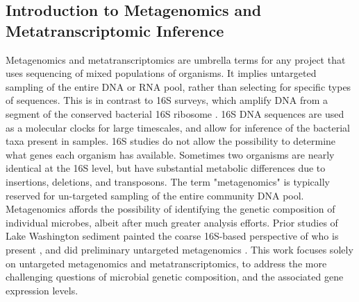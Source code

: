 \subsection{Introduction to Metagenomics and Metatranscriptomic Inference}
Metagenomics and metatranscriptomics are umbrella terms for any project that uses sequencing of mixed populations of organisms.
It implies untargeted sampling of the entire DNA or RNA pool, rather than selecting for specific types of sequences.
This is in contrast to 16S surveys, which amplify DNA from a segment of the conserved bacterial 16S ribosome \cite{kunin2008}.
16S DNA sequences are used as a molecular clocks for large timescales, and allow for inference of the bacterial taxa present in samples.
16S studies do not allow the possibility to determine what genes each organism has available.
Sometimes two organisms are nearly identical at the 16S level, but have substantial metabolic differences due to insertions, deletions, and transposons.  %
The term "metagenomics" is typically reserved for un-targeted sampling of the entire community DNA pool.
Metagenomics affords the possibility of identifying the genetic composition of individual microbes, albeit after much greater analysis efforts.
Prior studies of Lake Washington sediment painted the coarse 16S-based perspective of who is present \cite{beck2013LW, hernandez2015LW, oshkin2015LW}, and did preliminary untargeted metagenomics \cite{beck2013LW, oshkin2015LW}.
This work focuses solely on untargeted metagenomics and metatranscriptomics, to address the more challenging questions of microbial genetic composition, and the associated gene expression levels. %

